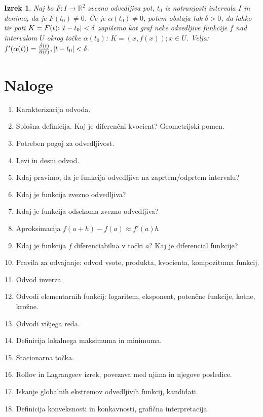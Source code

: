 \documentclass[a4paper,12pt]{report}
\newtheorem{izrek}{Izrek}[section]
\begin{document}
\begin{izrek}
    Naj bo $F: I \to \mathbb{R}^2$ zvezno odvedljiva pot, $t_0$ iz notranjosti intervala $I$ in denimo, da je $\dot{F}(t_0) \neq 0$. Če je $\dot{\alpha}(t_0) \neq 0$, 
    potem obstaja tak $\delta > 0$, da lahko tir poti $K = {F(t); \abs{t - t_0} < \delta}$ zapišemo kot graf neke odvedljive funkcije $f$ nad intervalom $U$ 
    okrog točke $\alpha(t_0)$: $K = {(x, f(x)); x \in U}$. Velja: $f'(\alpha(t)) = \frac{\dot{\beta}(t)}{\dot{\alpha}(t)}, \abs{t - t_0} < \delta$.
\end{izrek}


\pagebreak

\section*{Naloge}
\begin{enumerate}
    \item Karakterizacija odvoda.
    \item Splošna definicija. Kaj je diferenčni kvocient? Geometrijski pomen.
    \item Potreben pogoj za odvedljivost.
    \item Levi in desni odvod.
    \item Kdaj pravimo, da je funkcija odvedljiva na zaprtem/odprtem intervalu?
    \item Kdaj je funkcija zvezno odvedljiva?
    \item Kdaj je funkcija odsekoma zvezno odvedljiva?
    \item Aproksimacija $ f(a+h) - f(a) \approx f'(a) h $
    \item Kdaj je funkcija $f$ diferenciabilna v točki $a$? Kaj je diferencial funkcije?
    \item Pravila za odvajanje: odvod vsote, produkta, kvocienta, kompozituma funkcij.
    \item Odvod inverza.
    \item Odvodi elementarnih funkcij: logaritem, eksponent, potenčne funkcije, kotne, krožne.
    \item Odvodi višjega reda.
    \item Definicija lokalnega maksimuma in minimuma.
    \item Stacionarna točka.
    \item Rollov in Lagrangeev izrek, povezava med njima in njegove posledice.
    \item Iskanje globalnih ekstremov odvedljivih funkcij, kandidati.
    \item Definicija konveksnosti in konkavnosti, grafična interpretacija.

\end{enumerate}
\end{document}
